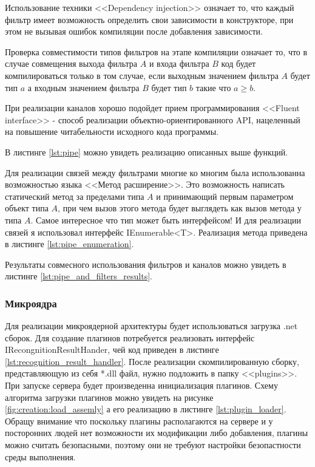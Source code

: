 Использование техники <<Dependency injection>> означает то, что каждый фильтр имеет возможность определить свои зависимости в конструкторе, при этом не вызывая ошибок компиляции после добавления зависимости.

Проверка совместимости типов фильтров на этапе компиляции означает то, что в случае совмещения выхода фильтра $A$ и входа фильтра $B$ код будет компилироваться только в том случае, если выходным значением фильтра $A$ будет тип $a$ а входным значением фильтра $B$ будет тип $b$ такие что $a \geq b$.

При реализации каналов хорошо подойдет прием программирования <<Fluent interface>> - способ реализации объектно-ориентированного API, нацеленный на повышение читабельности исходного кода программы.

В листинге \ref{lst:pipe} можно увидеть реализацию описанных выше функций.

Для реализации связей между фильтрами многие ко многим была использованна возможностью языка \csharp{} <<Метод расширение>>. Это возможность написать статический метод за пределами типа $A$ и принимающий первым параметром объект типа $A$, при чем вызов этого метода будет выглядеть как вызов метода у типа $A$. Самое интересное что тип может быть интерфейсом! И для реализации связей я использовал интерфейс IEnumerable<T>. Реализация метода приведена в листинге \ref{lst:pipe_enumeration}.

Результаты совмесного использования фильтров и каналов можно увидеть в листинге \ref{lst:pipe_and_filters_results}.


\subsubsection{Микроядра}

Для реализации микроядерной архитектуры будет использоваться загрузка .net сборок. Для создание плагинов потребуется реализовать интерфейс IRecongnitionResultHander, чей код приведен в листинге \ref{lst:recognition_result_handler}. После реализации скомпилированную сборку, представляющую из себя *.dll файл, нужно подложить в папку <<plugins>>. При запуске сервера будет произведенна инициализация плагинов. Схему алгоритма загрузки плагинов можно увидеть на рисунке \ref{fig:creation:load_assemly} а его реализацию в листинге \ref{lst:plugin_loader}. Обращу внимание что поскольку плагины располагаются на сервере и у посторонних людей нет возможности их модификации либо добавления, плагины можно считать безопасными, поэтому они не требуют настройки безопастности среды выполнения.

